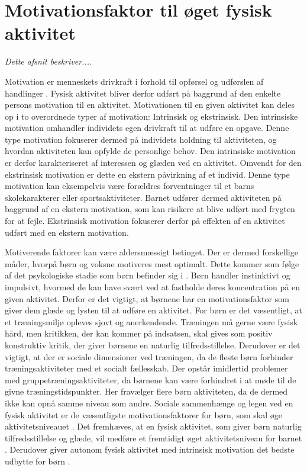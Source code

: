 \section{Motivationsfaktor til øget fysisk aktivitet}\label{motivation_boern}
\textit{Dette afsnit beskriver....}

Motivation er menneskets drivkraft i forhold til opførsel og udførslen af handlinger \citep{V.Brown2007}. Fysisk aktivitet bliver derfor udført på baggrund af den enkelte persons motivation til en aktivitet. Motivationen til en given aktivitet kan deles op i to overordnede typer af motivation: Intrinsisk og ekstrinsisk. Den intrinsiske motivation omhandler individets egen drivkraft til at udføre en opgave. Denne type motivation fokuserer dermed på individets holdning til aktiviteten, og hvordan aktiviteten kan opfylde de personlige behov. Den intrinsiske motivation er derfor karakteriseret af interessen og glæden ved en aktivitet. Omvendt for den ekstrinsisk motivation er dette en ekstern påvirkning af et individ. Denne type motivation kan eksempelvis være forældres forventninger til et barns skolekarakterer eller sportsaktiviteter. Barnet udfører dermed aktiviteten på baggrund af en ekstern motivation, som kan risikere at blive udført med frygten for at fejle. Ekstrinsisk motivation fokuserer derfor på effekten af en aktivitet udført med en ekstern motivation. \citep{J.Sebire2013} 

Motiverende faktorer kan være aldersmæssigt betinget. Der er dermed forskellige måder, hvorpå børn og voksne motiveres mest optimalt. Dette kommer som følge af det psykologiske stadie som børn befinder sig i \citep{V.Brown2007}. Børn handler instinktivt og impulsivt, hvormed de kan have svært ved at fastholde deres koncentration på en given aktivitet. Derfor er det vigtigt, at børnene har en motivationsfaktor som giver dem glæde og lysten til at udføre en aktivitet. \citep{V.Brown2007} \newline
For børn er det væsentligt, at et træningsmiljø opleves sjovt og anerkendende. Træningen må gerne være fysisk hård, men kritikken, der kan kommer på indsatsen, skal gives som positiv konstruktiv kritik, der giver børnene en naturlig tilfredsstillelse. Derudover er det vigtigt, at der er sociale dimensioner ved træningen, da de fleste børn forbinder træningsaktiviteter med et socialt fællesskab. Der opstår imidlertid problemer med gruppetræningsaktiviteter, da børnene kan være forhindret i at møde til de givne træningstidspunkter. Her fravælger flere børn aktiviteten, da de dermed ikke kan opnå samme niveau som andre. \citep{Wied2011,Romani2013}\newline
Sociale sammenhænge og legen ved en fysisk aktivitet er de væsentligste motivationsfaktorer for børn, som skal øge aktivitetsniveauet \citep{McWhorter2003,J.Sebire2013}. Det fremhæves, at en fysisk aktivitet, som giver børn naturlig tilfredsstillelse og glæde, vil medføre et fremtidigt øget aktivitetsniveau for barnet \citep{Romani2013}. Derudover giver autonom fysisk aktivitet med intrinsisk motivation det bedste udbytte for børn \citep{J.Sebire2013}.


